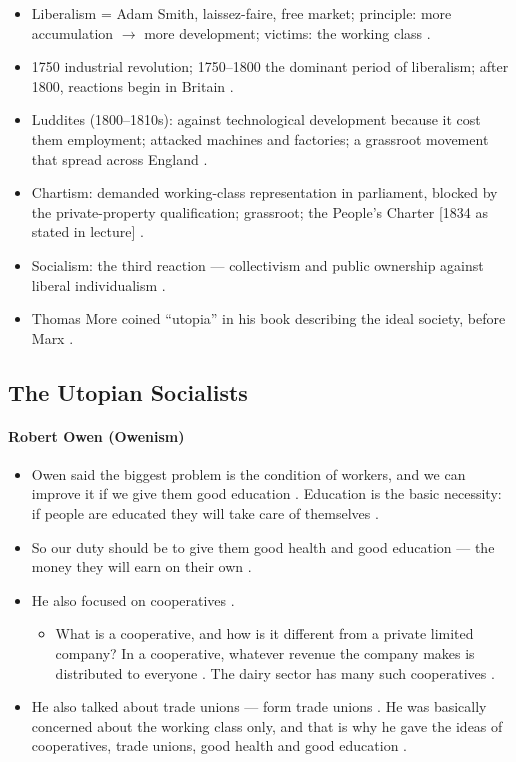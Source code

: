 \begin{QuickRevision}
\begin{itemize}
    \item Liberalism = Adam Smith, laissez-faire, free market; principle: more accumulation $\rightarrow$ more development; victims: the working class .
    \item 1750 industrial revolution; 1750--1800 the dominant period of liberalism; after 1800, reactions begin in Britain .
    \item Luddites (1800--1810s): against technological development because it cost them employment; attacked machines and factories; a grassroot movement that spread across England .
    \item Chartism: demanded working-class representation in parliament, blocked by the private-property qualification; grassroot; the People's Charter [1834 as stated in lecture] .
    \item Socialism: the third reaction --- collectivism and public ownership against liberal individualism .
    \item Thomas More coined ``utopia'' in his book describing the ideal society, before Marx .
\end{itemize}
\end{QuickRevision}

\subsection{The Utopian Socialists}

\paragraph{Robert Owen (Owenism)}
\begin{itemize}
    \item Owen said the biggest problem is the condition of workers, and we can improve it if we give them good education . Education is the basic necessity: if people are educated they will take care of themselves .
    \item So our duty should be to give them good health and good education --- the money they will earn on their own .
    \item He also focused on cooperatives .
    \begin{itemize}
        \item What is a cooperative, and how is it different from a private limited company? In a cooperative, whatever revenue the company makes is distributed to everyone . The dairy sector has many such cooperatives .
    \end{itemize}
    \item He also talked about trade unions --- form trade unions . He was basically concerned about the working class only, and that is why he gave the ideas of cooperatives, trade unions, good health and good education .
\end{itemize}

